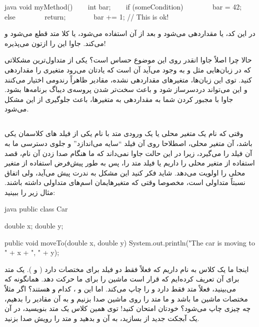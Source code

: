 \begin{codebox}{java}
void myMethod() {
    int bar;
    if (someCondition) {  
        bar = 42;  
    } else {
        return;  
    }  
    bar += 1; // This is ok!
}
\end{codebox}

در این کد، یا  مقداردهی می‌شود و بعد از آن استفاده
می‌شود، یا کلا متد قطع می‌شود و  می‌\-کند. جاوا این را
ازتون می\-‌پذیره!

حالا چرا اصلاً جاوا انقدر روی این موضوع حساس است؟ یکی از متداول‌ترین
مشکلاتی که در زبان‌هایی مثل  و  به وجود می‌آید آن است که
یادتان می‌رود متغیری را مقداردهی کنید. توی این زبان‌\-ها، متغیرهای
مقداردهی نشده، مقادیر ظاهراً رندومی اختیار می\-‌کنند و این می‌\-تواند
دردسرساز شود و باعث سخت‌تر شدن پروسه‌ی دیباگ برنامه\-‌ها بشود. جاوا با
مجبور کردن شما به مقداردهی به متغیرها، باعث جلوگیری از این مشکل می‌شود.

\subsection{}

وقتی که نام یک متغیر محلی یا یک ورودی متد با نام یکی از فیلد های کلاسمان
یکی باشد، آن متغیر محلی، اصطلاحا روی آن فیلد ``سایه می‌\-اندازد'' و جلوی
دسترسی ما به آن فیلد را می‌\-گیرد، زیرا در این حالت جاوا نمی‌داند که ما
هنگام صدا زدن آن نام، قصد استفاده از متغیر محلی را داریم یا فیلد متد را،
پس به طور پیش‌\-فرض استفاده از متغیر محلی را اولویت می‌دهد. شاید فکر کنید
این مشکل به ندرت پیش می‌آید، ولی  اتفاق نسبتاً متداولی است،
مخصوصا وقتی که متغیرهایمان اسم‌های متداولی داشته باشند. مثال زیر را
ببینید:

\begin{codebox}{java}
public class Car {
    double x;
    double y;
    
    public void moveTo(double x, double y) {  
        System.out.println("The car is moving to " + x + ", " + y);  
    }  
}
\end{codebox}

اینجا ما یک کلاس به نام  داریم که فعلاً فقط دو فیلد برای
مختصات دارد (  و  ). یک متد
 برای آن تعریف کرده‌ایم که قرار است ماشین را برای ما
حرکت دهد. همانگونه که می‌\-بینید، فعلاً متد  فقط دارد
 و  را چاپ می‌\-کند. اما این
 و  ، کدام  و
 هستند؟ اگر مثلاً مختصات ماشین ما  باشد
و ما متد  را روی ماشین صدا بزنیم و به آن مقادیر
 را بدهیم، چه چیزی چاپ می‌شود؟ خودتان امتحان کنید! توی
همین کلاس یک متد  بنویسید، در آن یک آبجکت جدید از
 بسازید، به آن  و  بدهید
و متد  را رویش صدا بزنید.

